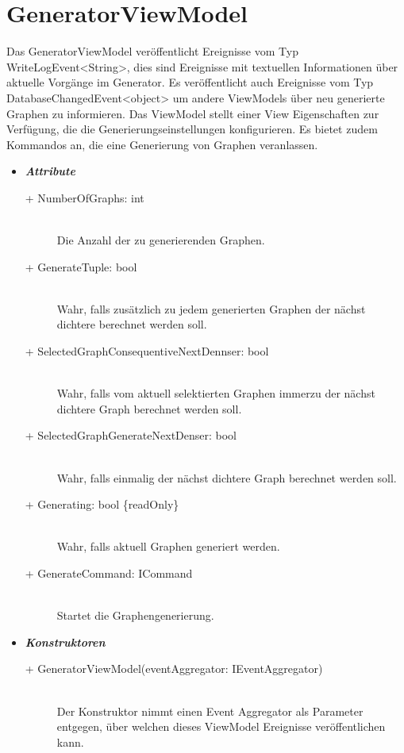 \documentclass[13pt]{scrreprt}
\begin{document}
	\section{GeneratorViewModel}
	Das GeneratorViewModel ver\"offentlicht Ereignisse vom Typ WriteLogEvent<String>, dies sind Ereignisse mit textuellen Informationen \"uber aktuelle Vorg\"ange im Generator. Es ver\"offentlicht auch Ereignisse vom Typ DatabaseChangedEvent<object> um andere ViewModels \"uber neu generierte Graphen zu informieren.
Das ViewModel stellt einer View Eigenschaften zur Verf\"ugung, die die Generierungseinstellungen konfigurieren. Es bietet zudem Kommandos an, die eine Generierung von Graphen veranlassen.
	\begin{itemize}[label = {$\circ$}]
		\item {\large \textbf{\textit{Attribute}}\par}
		\begin{description}
			\item [+ NumberOfGraphs: int] \hfill \\ Die Anzahl der 	zu generierenden Graphen.
			\item [+ GenerateTuple: bool] \hfill \\ Wahr, falls zus\"atzlich zu jedem generierten Graphen der n\"achst dichtere berechnet werden soll.
			\item [+ SelectedGraphConsequentiveNextDennser: bool] \hfill \\ Wahr, falls vom aktuell selektierten Graphen immerzu der n\"achst dichtere Graph berechnet werden soll. 
			\item [+ SelectedGraphGenerateNextDenser: bool] \hfill \\ Wahr, falls einmalig der n\"achst dichtere Graph berechnet werden soll.
			\item [+ Generating: bool \{readOnly\}] \hfill \\ Wahr, falls aktuell Graphen generiert werden.
			\item [+ GenerateCommand: ICommand] \hfill \\ Startet die Graphengenerierung.
		\end{description}
		\item {\large \textbf{\textit{Konstruktoren}}\par}
		\begin{description}
			\item [+  GeneratorViewModel(eventAggregator: IEventAggregator)] \hfill \\ Der Konstruktor nimmt einen Event Aggregator als Parameter entgegen, über welchen dieses ViewModel Ereignisse ver\"offentlichen kann.
		\end{description}
	\end{itemize}
	
\end{document}
